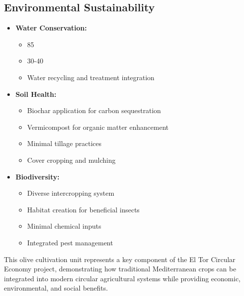 \subsection{Environmental Sustainability}
\begin{itemize}
    \item \textbf{Water Conservation:}
    \begin{itemize}
        \item 85%
        \item 30-40%
        \item Water recycling and treatment integration
    \end{itemize}
    
    \item \textbf{Soil Health:}
    \begin{itemize}
        \item Biochar application for carbon sequestration
        \item Vermicompost for organic matter enhancement
        \item Minimal tillage practices
        \item Cover cropping and mulching
    \end{itemize}
    
    \item \textbf{Biodiversity:}
    \begin{itemize}
        \item Diverse intercropping system
        \item Habitat creation for beneficial insects
        \item Minimal chemical inputs
        \item Integrated pest management
    \end{itemize}
\end{itemize}

This olive cultivation unit represents a key component of the El Tor Circular Economy project, demonstrating how traditional Mediterranean crops can be integrated into modern circular agricultural systems while providing economic, environmental, and social benefits.
